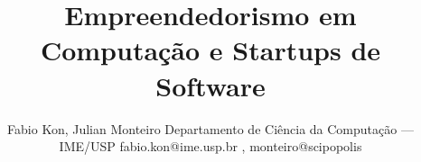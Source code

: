 \documentclass[brazil]{JAImod}
\begin{document}
\date{}

\title{Empreendedorismo em Computação e Startups de Software}

\author{Fabio Kon, Julian Monteiro
Departamento de Ciência da Computação --- IME/USP
fabio.kon@ime.usp.br , monteiro@scipopolis
}

\maketitle













\end{document}
